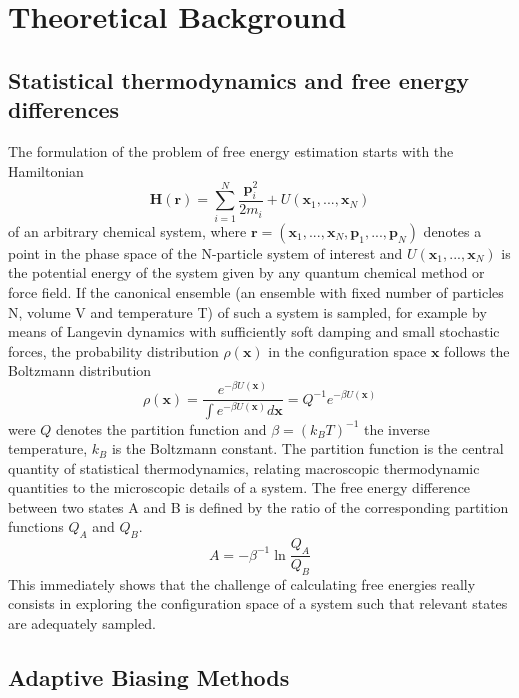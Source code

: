 \chapter{Theoretical Background}
\label{cha:theory}

\section{Statistical thermodynamics and free energy differences}

The formulation of the problem of free energy estimation starts with the Hamiltonian
\begin{equation}
  \textbf{H}(\textbf{r})=\sum_{i=1}^{N}\frac{\textbf{p}_{i}^2}{2m_i} + U(\textbf{x}_1,...,\textbf{x}_N)
\end{equation}
of an arbitrary chemical system, where $\textbf{r}=(\textbf{x}_1,...,\textbf{x}_N,\textbf{p}_1,...,\textbf{p}_N)$ denotes a point in the phase space of the N-particle system of interest and $U(\textbf{x}_1,...,\textbf{x}_N)$ is the potential energy of the system given by any quantum chemical method or force field. If the canonical ensemble (an ensemble with fixed number of particles N, volume V and temperature T) of such a system is sampled, for example by means of Langevin dynamics with sufficiently soft damping and small stochastic forces, the probability distribution $\rho(\textbf{x})$ in the configuration space $\textbf{x}$ follows the Boltzmann distribution
\begin{equation}
  \rho(\textbf{x})=\frac{e^{-\beta U(\textbf{x})}}{\int e^{-\beta U(\textbf{x})} d\textbf{x}}=Q^{-1}e^{-\beta U(\textbf{x})}
\end{equation}
were $Q$ denotes the partition function and $\beta=(k_B T)^{-1}$ the inverse temperature, $k_B$ is the Boltzmann constant. The partition function is the central quantity of statistical thermodynamics, relating macroscopic thermodynamic quantities to the microscopic details of a system. The free energy difference between two states A and B is defined by the ratio of the corresponding partition functions $Q_A$ and $Q_B$.
\begin{equation}
  A = -\beta^{-1}\ln \frac{Q_A}{Q_B}
\end{equation}
This immediately shows that the challenge of calculating free energies really consists in exploring the configuration space of a system such that relevant states are adequately sampled.



\section{Adaptive Biasing Methods}
\label{sec:adaptive biasing}

